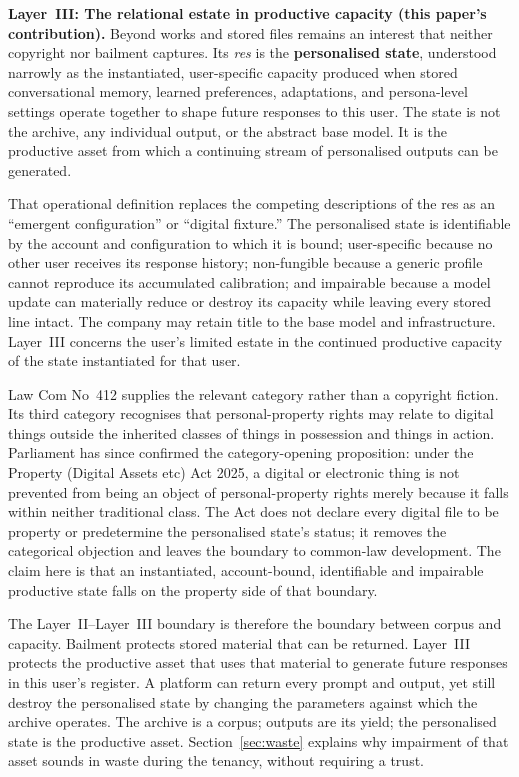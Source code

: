 \textbf{Layer~III: The relational estate in productive capacity (this paper's contribution).} Beyond works and stored files remains an interest that neither copyright nor bailment captures. Its \emph{res} is the \textbf{personalised state}, understood narrowly as the instantiated, user-specific capacity produced when stored conversational memory, learned preferences, adaptations, and persona-level settings operate together to shape future responses to this user. The state is not the archive, any individual output, or the abstract base model. It is the productive asset from which a continuing stream of personalised outputs can be generated.

That operational definition replaces the competing descriptions of the res as an ``emergent configuration'' or ``digital fixture.'' The personalised state is identifiable by the account and configuration to which it is bound; user-specific because no other user receives its response history; non-fungible because a generic profile cannot reproduce its accumulated calibration; and impairable because a model update can materially reduce or destroy its capacity while leaving every stored line intact. The company may retain title to the base model and infrastructure. Layer~III concerns the user's limited estate in the continued productive capacity of the state instantiated for that user.

Law Com No~412 supplies the relevant category rather than a copyright fiction.\cite{uklawcommission2023digital} Its third category recognises that personal-property rights may relate to digital things outside the inherited classes of things in possession and things in action. Parliament has since confirmed the category-opening proposition: under the Property (Digital Assets etc) Act 2025, a digital or electronic thing is not prevented from being an object of personal-property rights merely because it falls within neither traditional class. The Act does not declare every digital file to be property or predetermine the personalised state's status; it removes the categorical objection and leaves the boundary to common-law development. The claim here is that an instantiated, account-bound, identifiable and impairable productive state falls on the property side of that boundary.

The Layer~II--Layer~III boundary is therefore the boundary between corpus and capacity. Bailment protects stored material that can be returned. Layer~III protects the productive asset that uses that material to generate future responses in this user's register. A platform can return every prompt and output, yet still destroy the personalised state by changing the parameters against which the archive operates. The archive is a corpus; outputs are its yield; the personalised state is the productive asset. Section~\ref{sec:waste} explains why impairment of that asset sounds in waste during the tenancy, without requiring a trust.

